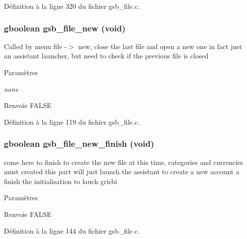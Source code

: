 Définition à la ligne 320 du fichier gsb\_\-file.c.

\subsubsection[{gsb\_\-file\_\-new}]{\setlength{\rightskip}{0pt plus 5cm}gboolean gsb\_\-file\_\-new (void)}\label{gsb__file_8h_a35c7bcb0049be8ba81b58621f30aeaa4}
Called by menu file -\/$>$ new, close the last file and open a new one in fact just an assistant launcher, but need to check if the previous file is closed


\begin{DoxyParams}{Paramètres}
\item[{\em none}]\end{DoxyParams}
\begin{DoxyReturn}{Renvoie}
FALSE 
\end{DoxyReturn}


Définition à la ligne 119 du fichier gsb\_\-file.c.

\subsubsection[{gsb\_\-file\_\-new\_\-finish}]{\setlength{\rightskip}{0pt plus 5cm}gboolean gsb\_\-file\_\-new\_\-finish (void)}\label{gsb__file_8h_afcc94609c83a3074948e9fa10ad592ee}
come here to finish to create the new file at this time, categories and currencies must created this part will just launch the assistant to create a new account a finish the initialisation to lauch grisbi


\begin{DoxyParams}{Paramètres}
\item[{\em }]\end{DoxyParams}
\begin{DoxyReturn}{Renvoie}
FALSE 
\end{DoxyReturn}


Définition à la ligne 144 du fichier gsb\_\-file.c.

